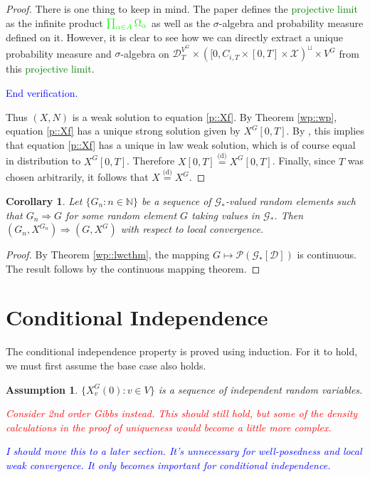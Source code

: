 \documentclass[12pt]{article}
\newcommand{\skipLine}{\vspace{12pt}}
\newcommand{\mb}{\mathbb}
\newcommand{\mc}{\mathcal}
\newcommand{\tr}{\textcolor{red}}
\newcommand{\tb}{\textcolor{blue}}
\newcommand{\tg}{\textcolor{green}}
\newcommand{\ind}{\hspace{24pt}}
\newcommand{\deq}{\overset{\text{(d)}}{=}}			%
\newcommand{\pmsr}{\mc{P}}							%
\newcommand{\cad}{\mc{D}}							%
\newcommand{\sta}{\mc{X}}							%
\newcommand{\Xf}{X}									%
\newcommand{\poiss}{N}								%
\newcommand{\vind}[1]{_{#1}}						%
\newcommand{\tme}[1]{(#1)}							%
\newcommand{\tmi}[1]{#1}							%
\newcommand{\gind}[1]{^{#1}}						%
\newcommand{\vpara}[1]{^{#1}}						%
\newcommand{\tpara}[1]{_{#1}}						%
\newcommand{\jumpibd}[2]{C_{#1,#2}}					%
\newcommand{\Gs}{\mc{G}_\ast}						%
\renewcommand{\sp}[1]{[#1]}							%
\renewcommand{\it}[1]{_{#1}}						%
\newtheorem{coro}[thms]{Corollary}
\newtheorem{assu}{Assumption}
\begin{document}
\begin{proof}
\ind There is one thing to keep in mind. The paper defines the \tg{projective limit} as the infinite product \(\tg{\prod_{\alpha \in A} \Omega_\alpha}\) as well as the \(\sigma\)-algebra and probability measure defined on it. However, it is clear to see how we can directly extract a unique probability measure and \(\sigma\)-algebra on \(\cad\vpara{V\gind{G}}\tpara{T}\times \left([0,\jumpibd{i}{T}\times [0,T]\times \sta\right)^\sqcup\times V\gind{G}\) from this \tg{projective limit}.
\skipLine

\tb{End verification.}

\ind Thus \((\Xf,\poiss)\) is a weak solution to equation \eqref{p::Xf}. By Theorem \ref{wp::wp}, equation \eqref{p::Xf} has a unique strong solution given by \(\Xf\gind{G}\tmi{[0,T]}\). By \cite[Proposition 2.10]{Kur07}, this implies that equation \eqref{p::Xf} has a unique in law weak solution, which is of course equal in distribution to \(\Xf\gind{G}\tmi{[0,T]}\). Therefore \(\Xf\tmi{[0,T]} \deq \Xf\gind{G}\tmi{[0,T]}\). Finally, since \(T\) was chosen arbitrarily, it follows that \(\Xf \deq \Xf\gind{G}\).
\end{proof}

\begin{coro}
Let \(\{G\it{n}:n\in\mb{N}\}\) be a sequence of \(\Gs\)-valued random elements such that \(G\it{n} \Rightarrow G\) for some random element \(G\) taking values in \(\Gs\). Then \((G\it{n},\Xf\gind{G\it{n}}) \Rightarrow (G,\Xf\gind{G})\) with respect to local convergence.
\end{coro}
\begin{proof}
By Theorem \ref{wp::lwcthm}, the mapping \(G \mapsto \pmsr(\Gs\sp{\cad})\) is continuous. The result follows by the continuous mapping theorem.
\end{proof}

\section{Conditional Independence}
\label{CI}

The conditional independence property is proved using induction. For it to hold, we must first assume the base case also holds.

\begin{assu}
\(\{\Xf\gind{G}\vind{v}\tme{0}:v \in V\}\) is a sequence of independent random variables. 

\tr{\ind Consider 2nd order Gibbs instead. This should still hold, but some of the density calculations in the proof of uniqueness would become a little more complex.} 

\tb{\ind I should move this to a later section. It's unnecessary for well-posedness and local weak convergence. It only becomes important for conditional independence.}
\label{CI::indinit}
\end{assu}
\end{document}
